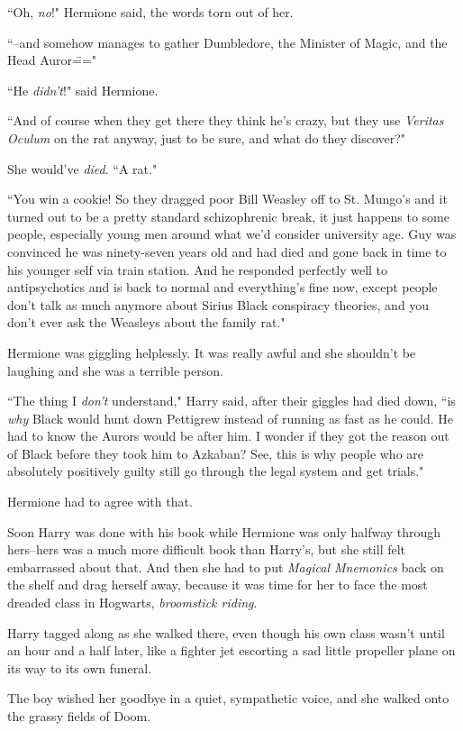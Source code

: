 ``Oh, \emph{no}!" Hermione said, the words torn out of her.

``\---and somehow manages to gather Dumbledore, the Minister of Magic, and the Head Auror\==="

``He \emph{didn't}!" said Hermione.

``And of course when they get there they think he's crazy, but they use \emph{Veritas Oculum} on the rat anyway, just to be sure, and what do they discover?"

She would've \emph{died}. ``A rat."

``You win a cookie! So they dragged poor Bill Weasley off to St. Mungo's and it turned out to be a pretty standard schizophrenic break, it just happens to some people, especially young men around what we'd consider university age. Guy was convinced he was ninety-seven years old and had died and gone back in time to his younger self via train station. And he responded perfectly well to antipsychotics and is back to normal and everything's fine now, except people don't talk as much anymore about Sirius Black conspiracy theories, and you don't ever ask the Weasleys about the family rat."

Hermione was giggling helplessly. It was really awful and she shouldn't be laughing and she was a terrible person.

``The thing I \emph{don't} understand," Harry said, after their giggles had died down, ``is \emph{why} Black would hunt down Pettigrew instead of running as fast as he could. He had to know the Aurors would be after him. I wonder if they got the reason out of Black before they took him to Azkaban? See, this is why people who are absolutely positively guilty still go through the legal system and get trials."

Hermione had to agree with that.

Soon Harry was done with his book while Hermione was only halfway through hers\---hers was a much more difficult book than Harry's, but she still felt embarrassed about that. And then she had to put \emph{Magical Mnemonics} back on the shelf and drag herself away, because it was time for her to face the most dreaded class in Hogwarts, \emph{broomstick riding}.

Harry tagged along as she walked there, even though his own class wasn't until an hour and a half later, like a fighter jet escorting a sad little propeller plane on its way to its own funeral.

The boy wished her goodbye in a quiet, sympathetic voice, and she walked onto the grassy fields of Doom.

